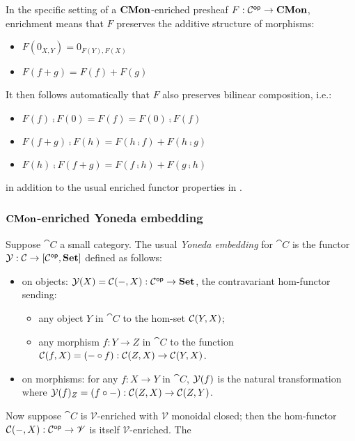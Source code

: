 In the specific setting of a $\mathbf{CMon}$-enriched presheaf $F: \mathcal{C}^{\mathsf{op}} \to \mathbf{CMon}$, enrichment means that $F$
preserves the additive structure of morphisms:
\begin{itemize}
\item $F(0_{X,Y}) = 0_{F(Y),F(X)}$
\item $F(f + g) = F(f) + F(g)$
\end{itemize}
It then follows automatically that $F$ also preserves bilinear composition, i.e.:
\begin{itemize}
\item $F(f) \comp F(0) = F(f) = F(0) \comp F(f)$
\item $F(f + g) \comp F(h) = F(h \comp f) + F(h \comp g)$
\item $F(h) \comp F(f + g) = F(f \comp h) + F(g \comp h)$
\end{itemize}
in addition to the usual enriched functor properties in .

\subsubsection{$\mathbf{CMon}$-enriched Yoneda embedding}

Suppose $\cat{C}$ a small category. The usual \emph{Yoneda embedding} for $\cat{C}$ is the functor $\mathcal{Y}:
\mathcal{C} \to [\mathcal{C}^{\mathsf{op}},\mathbf{Set}]$ defined as follows:
\begin{itemize}
\item on objects: $\mathcal{Y}(X) = {\mathcal{C}}(-,X): \mathcal{C}^{\mathsf{op}} \to \mathbf{Set}$, the contravariant hom-functor
sending:
   \begin{itemize}
   \item any object $Y$ in $\cat{C}$ to the hom-set ${\mathcal{C}}(Y,X)$;
   \item any morphism $f: Y \to Z$ in $\cat{C}$ to the function ${\mathcal{C}}(f,X) = (- \circ f):
   {\mathcal{C}}(Z,X) \to {\mathcal{C}}(Y,X)$.
   \end{itemize}
\item on morphisms: for any $f: X \to Y$ in $\cat{C}$, $\mathcal{Y}(f)$ is the natural transformation where
$\mathcal{Y}(f)_Z = (f \circ -): {\mathcal{C}}(Z,X) \to {\mathcal{C}}(Z,Y)$.
\end{itemize}

\noindent Now suppose $\cat{C}$ is $\mathscr{V}$-enriched with $\mathscr{V}$ monoidal closed; then the
hom-functor ${\mathcal{C}}(-,X): \mathcal{C}^{\mathsf{op}} \to \mathscr{V}$ is itself $\mathscr{V}$-enriched. The

